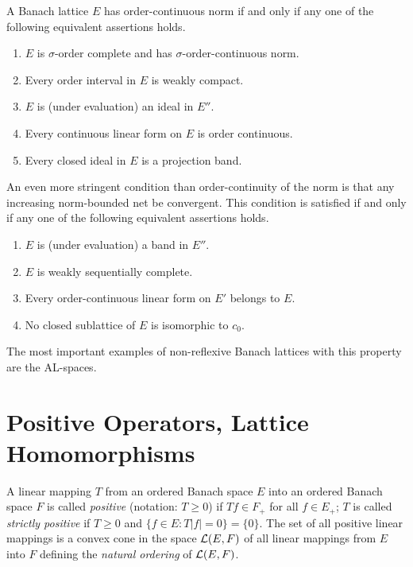 A Banach lattice $ E $ has order-continuous norm if and only if any one of the following equivalent assertions holds.
\begin{enumerate}[\upshape (a)]
	\item 
	$ E $ is $ \sigma $-order complete and has $ \sigma $-order-continuous norm.

	\item 
	Every order interval in $ E $ is weakly compact.

	\item 
	$ E $ is (under evaluation) an ideal in $ E'' $.

	\item 
	Every continuous linear form on $ E $ is order continuous.

	\item 
	Every closed ideal in $ E $ is a projection band.

\end{enumerate}
An even more stringent condition than order-continuity of the norm is that any increasing norm-bounded net be convergent.
This condition is satisfied if and only if any one of the following equivalent assertions holds.
\begin{enumerate}[\upshape (a)]

    \item 
    $ E $ is (under evaluation) a band in $ E'' $.
    
    \item 
    $ E $ is weakly sequentially complete.
    
    \item 
    Every order-continuous linear form on $ E' $ belongs to $ E $.
    
    \item 
    No closed sublattice of $ E $ is isomorphic to $ c_{0} $.

\end{enumerate}
The most important examples of non-reflexive Banach lattices with this property are the AL-spaces.
\section{Positive Operators, Lattice Homomorphisms}\label{sec:c1-6}%
A linear mapping $ T $ from an ordered Banach space $ E $ into an ordered Banach space $ F $ is called \emph{positive} (notation: $ T \geq 0 $) if $ Tf \in F_{+} $ for all $ f \in E_{+} $; $ T $ is called \emph{strictly positive} if $ T \geq 0 $ and $ \{f \in E \colon T|f| = 0\} = \{0\} $.
The set of all positive linear mappings is a convex cone in the space $ \mathcal{L}(E,F) $ of all linear mappings from $ E $ into $ F $ defining the \emph{natural ordering} of $ \mathcal{L}(E,F) $.

